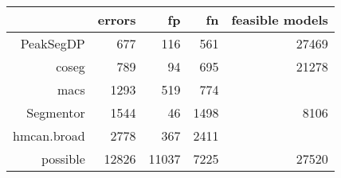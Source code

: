 \begin{tabular}{rrrrr}
  \hline
 & errors & fp & fn & feasible models \\ 
  \hline
PeakSegDP & 677 & 116 & 561 & 27469 \\ 
  coseg & 789 & 94 & 695 & 21278 \\ 
  macs & 1293 & 519 & 774 &  \\ 
  Segmentor & 1544 & 46 & 1498 & 8106 \\ 
  hmcan.broad & 2778 & 367 & 2411 &  \\ 
  \hline possible & 12826 & 11037 & 7225 & 27520 \\ 
   \hline
\end{tabular}
